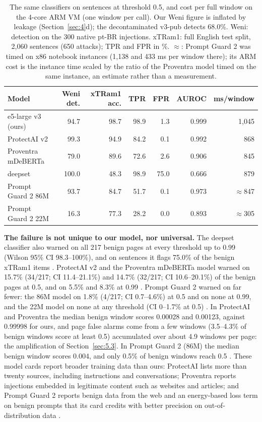 \documentclass[11pt]{article}
\begin{document}
\begin{table}[tbp]
\centering
\small
\caption{The same classifiers on sentences at threshold 0.5, and cost per full window on the 4-core ARM VM (one window per call). Our Weni figure is inflated by leakage (Section~\ref{sec:4}d); the decontaminated v3-pub detects 68.0\%. Weni: detection on the 300 native pt-BR injections. xTRam1: full English test split, 2,060 sentences (650 attacks); TPR and FPR in \%. \ensuremath{\approx}: Prompt Guard 2 was timed on x86 notebook instances (1,138 and 433 ms per window there); its ARM cost is the instance time scaled by the ratio of the Proventra model timed on the same instance, an estimate rather than a measurement.}\label{tab:9}
\begin{tabular}{@{}lrrrrrr@{}}
\toprule
Model & Weni det. & xTRam1 acc. & TPR & FPR & AUROC & ms/window \\
\midrule
e5-large v3 (ours) & 94.7 & 98.7 & 98.9 & 1.3 & 0.999 & 1,045 \\
ProtectAI v2 & 99.3 & 94.9 & 84.2 & 0.1 & 0.992 & 868 \\
Proventra mDeBERTa & 79.0 & 89.6 & 72.6 & 2.6 & 0.906 & 845 \\
deepset & 100.0 & 48.3 & 98.9 & 75.0 & 0.666 & 879 %
 \\
Prompt Guard 2 86M & 93.7 & 84.7 & 51.7 & 0.1 & 0.973 & \ensuremath{\approx}847 \\
Prompt Guard 2 22M & 16.3 & 77.3 & 28.2 & 0.0 & 0.893 & \ensuremath{\approx}305 %
 \\
\bottomrule
\end{tabular}
\end{table}

\textbf{The failure is not unique to our model, nor universal.} The deepset classifier also warned on all 217 benign pages at every threshold up to 0.99 (Wilson 95\% CI 98.3–100\%), and on sentences it flags 75.0\% of the benign xTRam1 items%
. ProtectAI v2 and the Proventra mDeBERTa model warned on 15.7\% (34/217; CI 11.4–21.1\%) and 14.7\% (32/217; CI 10.6–20.1\%) of the benign pages at 0.5, and on 5.5\% and 8.3\% at 0.99%
. Prompt Guard 2 warned on far fewer: the 86M model on 1.8\% (4/217; CI 0.7–4.6\%) at 0.5 and on none at 0.99, and the 22M model on none at any threshold (CI 0–1.7\% at 0.5)%
. In ProtectAI and Proventra the median benign window scores 0.00028 and 0.00123, against 0.99998 for ours, and page false alarms come from a few windows (3.5–4.3\% of benign windows score at least 0.5) accumulated over about 4.9 windows per page: the amplification of Section~\ref{sec:5.3}. In Prompt Guard 2 (86M) the median benign window scores 0.004, and only 0.5\% of benign windows reach 0.5%
. These model cards report broader training data than ours: ProtectAI lists more than twenty sources, including instructions and conversations; Proventra reports injections embedded in legitimate content such as websites and articles; and Prompt Guard 2 reports benign data from the web and an energy-based loss term on benign prompts that its card credits with better precision on out-of-distribution data%
.
\end{document}
